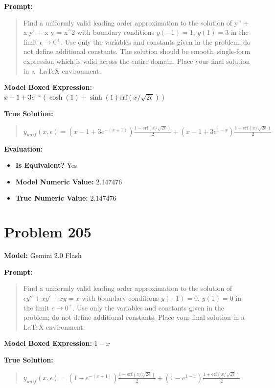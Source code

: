 \documentclass{article}
\begin{document}
{\textbf{Prompt:}
\begin{quote}
Find a uniformly valid leading order approximation to the solution of \epsilon y'' + x y' + x y = x^2 with boundary conditions $y(-1) = 1$, $y(1) = 3$ in the limit $\epsilon \to 0^+$. Use only the variables and constants given in the problem; do not define additional constants. The solution should be smooth, single-form expression which is valid across the entire domain. Place your final solution in a $\boxed{}$ LaTeX environment.
\end{quote}
\textbf{Model Boxed Expression:} $x-1 + 3e^{-x}(\cosh(1) + \sinh(1)\text{erf}(x/\sqrt{2\epsilon}))$

\textbf{True Solution:}
\begin{quote}
$y_{unif}(x, \epsilon) = \left(x - 1 + 3e^{-(x+1)}\right) \frac{1-\text{erf}(x/\sqrt{2\epsilon})}{2} + \left(x - 1 + 3e^{1-x}\right) \frac{1+\text{erf}(x/\sqrt{2\epsilon})}{2}$
\end{quote}

\textbf{Evaluation:}
\begin{itemize}
\item \textbf{Is Equivalent?} Yes
\item \textbf{Model Numeric Value:} 2.147476
\item \textbf{True Numeric Value:} 2.147476
\end{itemize}
\vspace{1cm}
\section*{Problem 205}
\textbf{Model:} Gemini 2.0 Flash

\textbf{Prompt:}
\begin{quote}
Find a uniformly valid leading order approximation to the solution of $\epsilon y'' + x y' + x y = x$ with boundary conditions $y(-1) = 0$, $y(1) = 0$ in the limit $\epsilon \to 0^+$. Use only the variables and constants given in the problem; do not define additional constants. Place your final solution in a $\boxed{}$ LaTeX environment.
\end{quote}
\textbf{Model Boxed Expression:} $1 - x$

\textbf{True Solution:}
\begin{quote}
$y_{unif}(x, \epsilon) = \left(1 - e^{-(x+1)}\right) \frac{1-\text{erf}(x/\sqrt{2\epsilon})}{2} + \left(1 - e^{1-x}\right) \frac{1+\text{erf}(x/\sqrt{2\epsilon})}{2}$
\end{quote}

}
\end{document}
